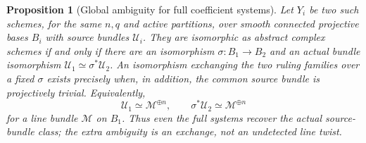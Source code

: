 \documentclass[11pt,reqno]{amsart}
\numberwithin{equation}{section}
\newtheorem{proposition}[theorem]{Proposition}
\theoremstyle{definition}\newtheorem{definition}[theorem]{Definition}
\theoremstyle{remark}\newtheorem{remark}[theorem]{Remark}
\begin{document}
\begin{proposition}[Global ambiguity for full coefficient systems]
\label{prop:full-global-ambiguity-v148}
Let \(Y_i\) be two such schemes, for the same \(n,q\) and
active partitions, over smooth connected projective bases \(B_i\)
with source bundles \(\mathcal U_i\).  They are isomorphic as
abstract complex schemes if and only if there are an isomorphism
\(\sigma:B_1\to B_2\) and an actual bundle isomorphism
\(\mathcal U_1\simeq\sigma^*\mathcal U_2\).
An isomorphism exchanging the two ruling families over a fixed
\(\sigma\) exists precisely when, in addition, the common source
bundle is projectively trivial.  Equivalently,
\[
 \mathcal U_1\simeq\mathcal M^{\oplus n},\qquad
 \sigma^*\mathcal U_2\simeq\mathcal M^{\oplus n}
\]
for a line bundle \(\mathcal M\) on \(B_1\).
Thus even the full systems recover the actual source-bundle class;
the extra ambiguity is an exchange, not an undetected line twist.
\end{proposition}
\end{document}
